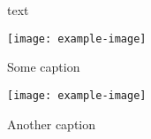 \documentclass{article}
\begin{document}
text
\begin{program}
\centering
\texttt{[image: example-image]}
\caption{Some caption}
\end{program}

\begin{sidewaysprogram}
\centering
\texttt{[image: example-image]}
\caption{Another caption}
\end{sidewaysprogram}
\end{document}
